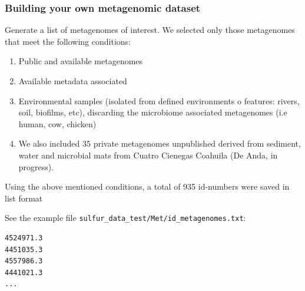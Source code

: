 \documentclass[12pt]{report}
\begin{document}
\subsubsection{Building your own metagenomic dataset}

Generate a list of metagenomes of interest. We selected only those metagenomes that meet the following
conditions:
\begin{enumerate}
\item Public and available metagenomes
\item Available metadata associated 
\item Environmental samples (isolated from defined environments o features:
rivers, soil, biofilms, etc), discarding the microbiome associated metagenomes
(i.e human, cow, chicken)
\item We also included 35 private metagenomes unpublished derived from
sediment, water and microbial mats from Cuatro Cienegas Coahuila (De Anda, in
progress).
\end{enumerate}

Using the above mentioned conditions, a total of 935 id-numbers were
saved in list format

See the example file \verb+sulfur_data_test/Met/id_metagenomes.txt+: 
\begin{verbatim} 
4524971.3
4451035.3
4557986.3
4441021.3
...
\end{verbatim}
\end{document}
